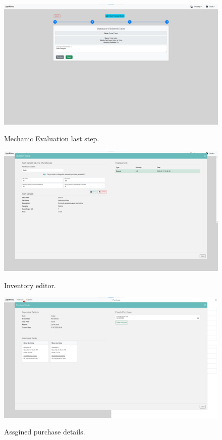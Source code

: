 \begin{figure}[htbp]
  \caption{Mechanic Evaluation last step.}
  \centering
  \includegraphics[width=\textwidth]{figs/Implementation/mechanic/EvaluationLastStep}
  \label{fig:EvaluationLastStep}
\end{figure}




\begin{figure}[htbp]
  \caption{Inventory editor.}
  \centering
  \includegraphics[width=\textwidth]{figs/Implementation/warehouse/inventoryEdit}
  \label{fig:inventoryEdit}
\end{figure}



\begin{figure}[htbp]
  \caption{Assgined purchase details.}
  \centering
  \includegraphics[width=\textwidth]{figs/Implementation/warehouse/PurchaseDetails}
  \label{fig:PurchaseDetails}
\end{figure}


